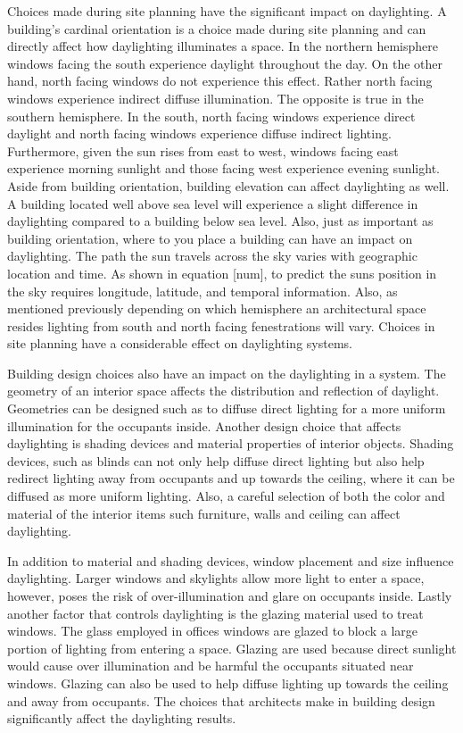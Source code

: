 Choices made during site planning have the significant impact on daylighting.
A building's cardinal orientation is a choice made during site planning and can directly affect how daylighting illuminates a space.
In the northern hemisphere windows facing the south experience daylight throughout the day.
On the other hand, north facing windows do not experience this effect.
Rather north facing windows experience indirect diffuse illumination.
The opposite is true in the southern hemisphere.
In the south, north facing windows experience direct daylight and north facing windows experience diffuse indirect lighting.
Furthermore, given the sun rises from east to west, windows facing east experience morning sunlight and those facing west experience evening sunlight.
Aside from building orientation, building elevation can affect daylighting as well.
A building located well above sea level will experience a slight difference in daylighting compared to a building below sea level.
Also, just as important as building orientation, where to you place a building can have an impact on daylighting.
The path the sun travels across the sky varies with geographic location and time.
As shown in equation [num], to predict the suns position in the sky requires longitude, latitude, and temporal information. Also, as mentioned previously depending on which hemisphere an architectural space resides lighting from south and north facing fenestrations will vary.
Choices in site planning have a considerable effect on daylighting systems.

Building design choices also have an impact on the daylighting in a system.
The geometry of an interior space affects the distribution and reflection of daylight.
Geometries can be designed such as to diffuse direct lighting for a more uniform illumination for the occupants inside.
Another design choice that affects daylighting is shading devices and material properties of interior objects.
Shading devices, such as blinds can not only help diffuse direct lighting but also help redirect lighting away from occupants and up towards the ceiling, where it can be diffused as more uniform lighting.
Also, a careful selection of both the color and material of the interior items such furniture, walls and ceiling can affect daylighting.

In addition to material and shading devices, window placement and size influence daylighting.
Larger windows and skylights allow more light to enter a space, however, poses the risk of over-illumination and glare on occupants inside.
Lastly another factor that controls daylighting is the glazing material used to treat windows.
The glass employed in offices windows are glazed to block a large portion of lighting from entering a space.
Glazing are used because direct sunlight would cause over illumination and be harmful the occupants situated near windows.
Glazing can also be used to help diffuse lighting up towards the ceiling and away from occupants.
The choices that architects make in building design significantly affect the daylighting results.

